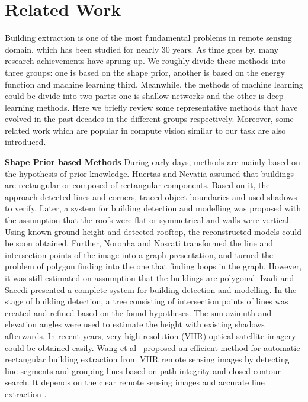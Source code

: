 \section{Related Work}
\label{Sec:RelatedWork}


Building extraction is one of the most fundamental problems in remote sensing domain, which has been studied for nearly 30 years.
As time goes by, many research achievements have sprung up.
We roughly divide these methods into three groups: one is based on the shape prior, another is based on the energy function and machine learning third. Meanwhile, the methods of machine learning could be divide into two parts: one is shallow networks and the other is deep learning methods.
Here we briefly review some representative methods that have evolved in the past decades in the different groups respectively.
Moreover, some related work which are popular in compute vision similar to our task are also introduced.



\textbf{Shape Prior based Methods} During early days, methods are mainly based on the hypothesis of prior knowledge.
Huertas and Nevatia \cite{IEEEexample:huertas1988detecting} assumed that buildings are rectangular or composed of rectangular components.
Based on it, the approach detected lines and corners, traced object boundaries and used shadows to verify.
Later, a system \cite{IEEEexample:noronha2001detection} for building detection and modelling was proposed with the assumption that the roofs were flat or symmetrical and walls were vertical.
Using known ground height and detected rooftop, the reconstructed models could be soon obtained.
Further, Noronha and Nosrati \cite{IEEEexample:nosrati2009novel} transformed the line and intersection points of the image into a graph presentation, and turned the problem of polygon finding into the one that finding loops in the graph.
However, it was still estimated on assumption that the buildings are polygonal.
Izadi and Saeedi\cite{IEEEexample:izadi2012three} presented a complete system for building detection and modelling.
In the stage of building detection, a tree consisting of intersection points of lines was created and refined based on the found hypotheses.
The sun azimuth and elevation angles were used to estimate the height with existing shadows afterwards.
In recent years, very high resolution (VHR) optical satellite imagery could be obtained easily.
Wang et al~\cite{IEEEexample:wang2015efficient} proposed an efficient method for automatic rectangular building extraction from VHR remote sensing images by detecting line segments and grouping lines based on path integrity and closed contour search. It depends on the clear remote sensing images and accurate line extraction . 


